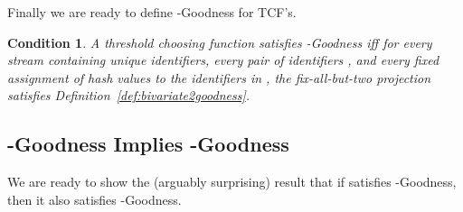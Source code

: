 \documentclass{article}
\newtheorem{condition}[theorem]{Condition}
\begin{document}
Finally we are ready to define -Goodness for TCF's.

\begin{condition}\label{key-condition2}
A threshold choosing function  satisfies -Goodness iff for every stream 
containing  unique identifiers, every pair of identifiers , and every fixed 
assignment  of hash values to the identifiers in ,
the fix-all-but-two projection  satisfies Definition~\ref{def:bivariate2goodness}.
\end{condition}


\subsection{-Goodness Implies -Goodness}
\label{1implies2}
We are ready to show the (arguably surprising) result that if  satisfies -Goodness, then it also satisfies -Goodness. 
\end{document}
